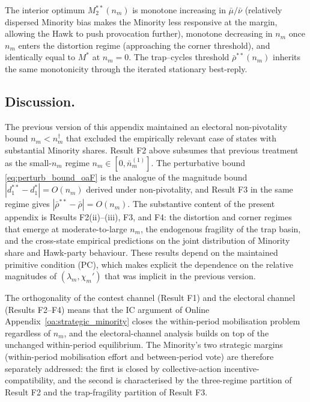 \documentclass[11pt,twoside]{extarticle}
\begin{document}
The interior optimum $M_2^{**}(n_m)$ is monotone increasing in $\bar\mu/\bar\nu$ (relatively dispersed Minority bias makes the Minority less responsive at the margin, allowing the Hawk to push provocation further), monotone decreasing in $n_m$ once $n_m$ enters the distortion regime (approaching the corner threshold), and identically equal to $M^{*}$ at $n_m=0$. The trap--cycles threshold $\bar\rho^{**}(n_m)$ inherits the same monotonicity through the iterated stationary best-reply.

\subsection*{Discussion.} The previous version of this appendix maintained an electoral non-pivotality bound $n_m<n_m^{\dagger}$ that excluded the empirically relevant case of states with substantial Minority shares. Result F2 above subsumes that previous treatment as the small-$n_m$ regime $n_m\in[0,\bar n_m^{(1)}]$. The perturbative bound \autoref{eq:perturb_bound_oaF} is the analogue of the magnitude bound $|d_1^{**}-d_1^{*}|=O(n_m)$ derived under non-pivotality, and Result F3 in the same regime gives $|\bar\rho^{**}-\bar\rho|=O(n_m)$. The substantive content of the present appendix is Results F2(ii)--(iii), F3, and F4: the distortion and corner regimes that emerge at moderate-to-large $n_m$, the endogenous fragility of the trap basin, and the cross-state empirical predictions on the joint distribution of Minority share and Hawk-party behaviour. These results depend on the maintained primitive condition (PC), which makes explicit the dependence on the relative magnitudes of $(\lambda_m,\chi_m')$ that was implicit in the previous version.

The orthogonality of the contest channel (Result F1) and the electoral channel (Results F2--F4) means that the IC argument of Online Appendix~\ref{oa:strategic_minority} closes the within-period mobilisation problem regardless of $n_m$, and the electoral-channel analysis builds on top of the unchanged within-period equilibrium. The Minority's two strategic margins (within-period mobilisation effort and between-period vote) are therefore separately addressed: the first is closed by collective-action incentive-compatibility, and the second is characterised by the three-regime partition of Result F2 and the trap-fragility partition of Result F3.
\end{document}
